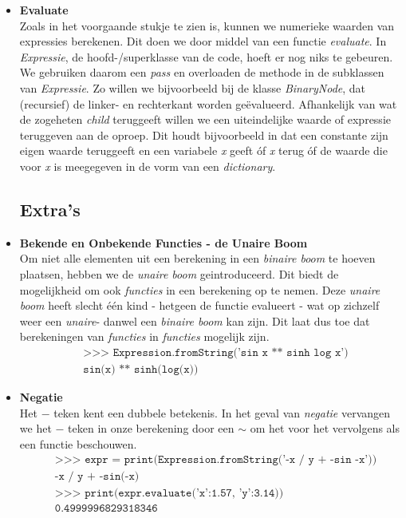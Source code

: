 \documentclass[12pt]{article}
\begin{document}
\begin{itemize}
\item \textbf{Evaluate}\\
Zoals in het voorgaande stukje te zien is, kunnen we numerieke waarden van expressies berekenen. Dit doen we door middel van een functie \textit{evaluate}. In \textit{Expressie}, de hoofd-/superklasse van de code, hoeft er nog niks te gebeuren. We gebruiken daarom een \textit{pass} en overloaden de methode in de subklassen van \textit{Expressie}. Zo willen we bijvoorbeeld bij de klasse \textit{BinaryNode}, dat (recursief) de linker- en rechterkant worden ge\"{e}valueerd. Afhankelijk van wat de zogeheten \textit{child} teruggeeft willen we een uiteindelijke waarde of expressie teruggeven aan de oproep. Dit houdt bijvoorbeeld in dat een constante zijn eigen waarde teruggeeft en een variabele \textit{x} geeft \'{o}f \textit{x} terug \'{o}f de waarde die voor \textit{x} is meegegeven in de vorm van een \textit{dictionary}.


\newpage
\subsection{Extra's}

\item \textbf{Bekende en Onbekende Functies - de Unaire Boom} \\
Om niet alle elementen uit een berekening in een \textit{binaire boom} te hoeven plaatsen, hebben we de \textit{unaire boom} geintroduceerd. Dit biedt de mogelijkheid om ook \textit{functies} in een berekening op te nemen. Deze \textit{unaire boom} heeft slecht \'e\'en kind - hetgeen de functie evalueert - wat op zichzelf weer een \textit{unaire}- danwel een \textit{binaire boom} kan zijn. Dit laat dus toe dat berekeningen van \textit{functies} in \textit{functies} mogelijk zijn.
\begin{align*}
&\texttt{>>> Expression.fromString('sin x ** sinh log x')}\\
&\texttt{sin(x) ** sinh(log(x))}
\end{align*}

\item \textbf{Negatie} \\
Het $-$ teken kent een dubbele betekenis. In het geval van \textit{negatie} vervangen we het $-$ teken in onze berekening door een $\sim$ om het voor het vervolgens als een functie beschouwen. 
\begin{align*}
&\texttt{>>> expr =  print(Expression.fromString('-x / y + -sin -x'))}\\
&\texttt{-x / y + -sin(-x)}\\
&\texttt{>>> print(expr.evaluate({'x':1.57, 'y':3.14}))}\\
&\texttt{0.4999996829318346}
\end{align*}


\end{itemize}
\end{document}
